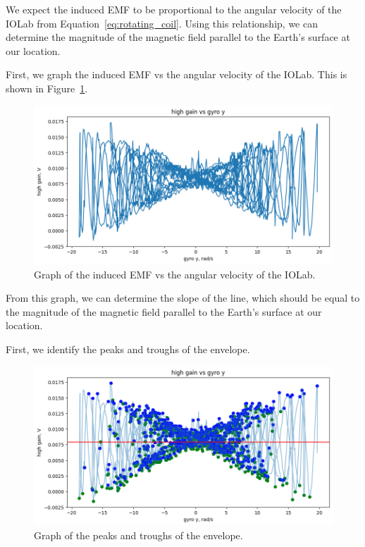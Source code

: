 \documentclass[11pt]{article}
\begin{document}
    We expect the induced EMF to be proportional to the angular velocity of the IOLab from Equation~\ref{eq:rotating_coil}.
    Using this relationship, we can determine the magnitude of the magnetic field parallel to the Earth's surface at our location.

    First, we graph the induced EMF vs the angular velocity of the IOLab.
    This is shown in Figure~\ref{fig:part_1_graph}.

    \begin{figure}[H]
        \centering
        \includegraphics[width=0.8\linewidth]{resources/images/part 1 graph}
        \caption{Graph of the induced EMF vs the angular velocity of the IOLab.}
        \label{fig:part_1_graph}
    \end{figure}

    From this graph, we can determine the slope of the line, which should be equal to the magnitude of the magnetic field parallel to the Earth's surface at our location.

    First, we identify the peaks and troughs of the envelope.

    \begin{figure}[H]
        \centering
        \includegraphics[width=0.8\linewidth]{resources/images/part 1 peaks}
        \caption{Graph of the peaks and troughs of the envelope.}
        \label{fig:part_1_peaks_and_troughs}
    \end{figure}
\end{document}
